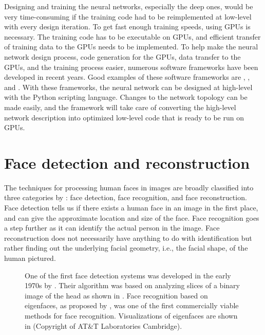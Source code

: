 Designing and training the neural networks, especially the deep ones, would be very time-consuming if the training code had to be reimplemented at low-level with every design iteration. To get fast enough training speeds, using \acp{GPU} is necessary. The training code has to be executable on \acp{GPU}, and efficient transfer of training data to the \acp{GPU} needs to be implemented. To help make the neural network design process, code generation for the \acp{GPU}, data transfer to the \acp{GPU}, and the training process easier, numerous software frameworks have been developed in recent years. Good examples of these software frameworks are \textcite{cntk}, \textcite{tensorflow}, and \textcite{pytorch}. With these frameworks, the neural network can be designed at high-level with the Python scripting language. Changes to the network topology can be made easily, and the framework will take care of converting the high-level network description into optimized low-level code that is ready to be run on \acp{GPU}. \cite{cntk,tensorflow,pytorch}

\section{Face detection and reconstruction}

The techniques for processing human faces in images are broadly classified into three categories by \textcite{Datta2015}: face detection, face recognition, and face reconstruction. Face detection tells us if there exists a human face in an image in the first place, and can give the approximate location and size of the face. Face recognition goes a step further as it can identify the actual person in the image. Face reconstruction does not necessarily have anything to do with identification but rather finding out the underlying facial geometry, i.e., the facial shape, of the human pictured.

\begin{figure}
    \centering
    \qquad\qquad
    \caption[Face detection 1]{One of the first face detection systems was developed in the early 1970s by \textcite{Sakai1972}. Their algorithm was based on analyzing slices of a binary image of the head as shown in \protect{}. Face recognition based on eigenfaces, as proposed by \textcite{Turk1991}, was one of the first commercially viable methods for face recognition. Visualizations of eigenfaces are shown in \protect{} (Copyright of AT\&T Laboratories Cambridge).}
    \label{fig:face_detection_1}
\end{figure}

